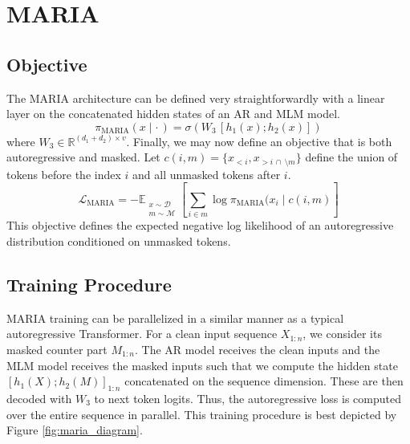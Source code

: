 \section*{MARIA}
\subsection*{Objective}
The MARIA architecture can be defined very straightforwardly with a linear layer on the concatenated hidden states of an AR and MLM model.
\begin{equation}
    \pi_{\mathrm{MARIA}}(x \mid \cdot\,) = \sigma(W_3 \, [h_1(x); h_2(x)])
\end{equation}
where $W_3 \in \mathbb{R}^{(d_1+d_2) \times v}$. Finally, we may now define an objective that is both autoregressive and masked. Let $c(i, m) = \{x_{<i}, x_{>i \, \cap \, \setminus m }\}$ define the union of tokens before the index $i$  and all unmasked tokens after $i$.
\begin{equation*}
\mathcal{L}_{\mathrm{MARIA}} = -\mathbb{E}_{\substack{x \sim \mathcal{D}\\m \sim \mathcal{M}}}\left[ \sum_{i \in m} \log \pi_{\mathrm{MARIA}}(x_i \mid c(i, m) \right]
\end{equation*}
This objective defines the expected negative log likelihood of an autoregressive distribution conditioned on unmasked tokens.
\subsection*{Training Procedure}
MARIA training can be parallelized in a similar manner as a typical autoregressive Transformer. For a clean input sequence $X_{1:n}$, we consider its masked counter part $M_{1:n}$. The AR model receives the clean inputs and the MLM model receives the masked inputs such that we compute the hidden state $[h_1(X); h_2(M)]_{1:n}$ concatenated on the sequence dimension. These are then decoded with $W_3$ to next token logits. Thus, the autoregressive loss is computed over the entire sequence in parallel. This training procedure is best depicted by Figure \ref{fig:maria_diagram}. 
